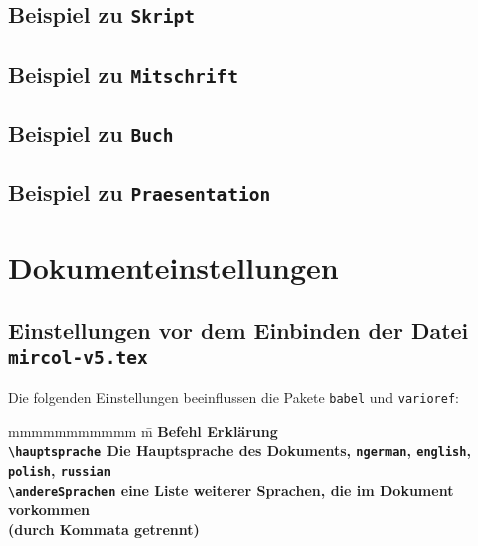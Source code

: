 		
		\begin{center}
			\vspace*{20em}
			\subsection{Beispiel zu \tt Skript}
		\end{center}
		\newpage
		
		\begin{center}
			\vspace*{20em}
			\subsection{Beispiel zu \tt Mitschrift}
		\end{center}
		\newpage
		
		\begin{center}
			\vspace*{20em}
			\subsection{Beispiel zu \tt Buch}
		\end{center}
		\newpage
		
		\begin{center}
			\vspace*{20em}
			\subsection{Beispiel zu \tt Praesentation}
		\end{center}
		\newpage


	
	\section{Dokumenteinstellungen}
		\subsection{Einstellungen vor dem Einbinden der Datei \texttt{mircol-v5.tex}}
			Die folgenden Einstellungen beeinflussen die Pakete \texttt{babel} und \texttt{varioref}:
			\begin{tabbing}
				mmmmmmmmmmm 			\= m \kill
				\bf Befehl				\> \bf Erklärung \\
				\verb|\hauptsprache|	\> Die Hauptsprache des Dokuments, \zb \verb|ngerman|, \verb|english|, \\
										\> \verb|polish|, \verb|russian|  \\
				\verb|\andereSprachen|	\> eine Liste weiterer Sprachen, die im Dokument vorkommen \\
										\> (durch Kommata getrennt)
			\end{tabbing}
